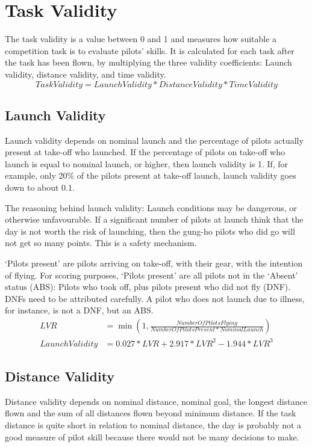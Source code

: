 \documentclass{article}
\begin{document}
\newpage
\section{Task Validity}
The task validity is a value between 0 and 1 and measures how suitable
a competition task is to evaluate pilots’ skills. It is calculated for each
task after the task has been flown, by multiplying the three validity
coefficients: Launch validity, distance validity, and time validity.
\begin{equation*}
    TaskValidity = LaunchValidity * DistanceValidity * TimeValidity
\end{equation*}

\subsection{Launch Validity}
\label{sec:launch-validity}
Launch validity depends on nominal launch and the percentage of pilots actually
present at take-off who launched. If the percentage of pilots on take-off who
launch is equal to nominal launch, or higher, then launch validity is 1. If,
for example, only 20\% of the pilots present at take-off launch, launch
validity goes down to about 0.1.

The reasoning behind launch validity: Launch conditions may be dangerous, or
otherwise unfavourable.  If a significant number of pilots at launch think that
the day is not worth the risk of launching, then the gung-ho pilots who did go
will not get so many points. This is a safety mechanism.

‘Pilots present’ are pilots arriving on take-off, with their gear, with the
intention of flying. For scoring purposes, ‘Pilots present’ are all pilots not
in the ‘Absent’ status (ABS): Pilots who took off, plus pilots present who did
not fly (DNF). DNFs need to be attributed carefully. A pilot who does not
launch due to illness, for instance, is not a DNF, but an ABS.
\begin{align*}
    LVR &= \min(1, \frac{NumberOfPilotsFlying}{NumberOfPilotsPresent * NominalLaunch}) \\
    LaunchValidity &= 0.027 * LVR + 2.917 * LVR^2 - 1.944 * LVR^3
\end{align*}

\subsection{Distance Validity}
\label{sec:distance-validity}
Distance validity depends on nominal distance, nominal goal, the longest
distance flown and the sum of all distances flown beyond minimum distance. If
the task distance is quite short in relation to nominal distance, the day is
probably not a good measure of pilot skill because there would not be many
decisions to make.
\end{document}
